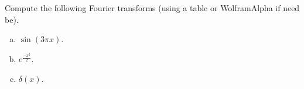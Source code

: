 \documentclass[12pt]{article} %
\begin{document}
\begin{problem}
Compute the following Fourier transforms (using a table or WolframAlpha if need be).  
\begin{enumerate}[(a)]
	\item $\sin(3\pi x)$.
	\item $e^{\frac{-x^2}{2}}$.
	\item $\delta(x)$.
\end{enumerate}
\end{problem}

%
\end{document}
